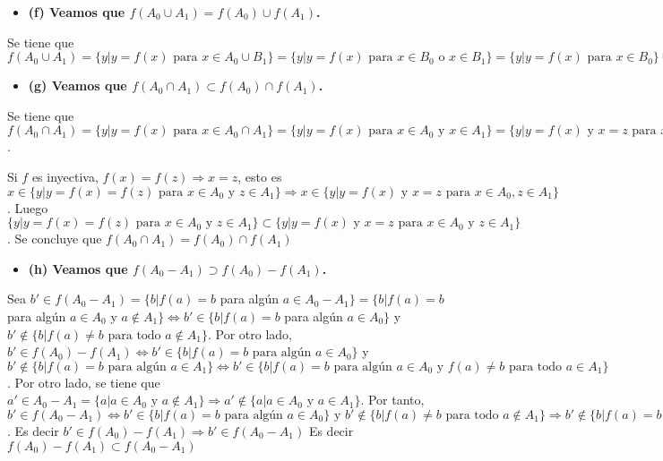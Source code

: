 \documentclass{article}
\begin{document}
\begin{itemize}
\item \bf (f) \rm Veamos que $f(A_0\cup A_1)= f(A_0)\cup f(A_1)$.
\end{itemize}
Se tiene que $f(A_0\cup A_1)=\{y|y=f(x) \text{ para }x\in A_0\cup B_1\}=\{y|y=f(x) \text{ para }x\in B_0\text{ o } x\in B_1\}=\{y|y=f(x) \text{ para }x\in B_0\}\cup \{y|y=f(x) \text{ para }x\in B_1\}=f(B_0)\cup f(B_1)$
\begin{itemize}
\item \bf (g) \rm Veamos que $f(A_0\cap A_1)\subset f(A_0)\cap f(A_1)$.
\end{itemize}
Se tiene que $f(A_0\cap A_1)=\{y|y=f(x) \text{ para }x\in A_0\cap A_1\}=\{y|y=f(x) \text{ para }x\in A_0\text{ y } x\in A_1\}=\{y|y=f(x) \text{ y } x=z \text{ para }x\in A_0,z\in A_1\}\subset\{y|y=f(x)=f(z) \text{ para }x\in A_0\text{ y } z\in A_1\}=\{y|y=f(x) \text{ para }x\in A_0\}\cap \{y|y=f(x) \text{ para }x\in A_1\}=f(A_0)\cap f(A_1)$.

Si $f$ es inyectiva, $f(x)=f(z)\Rightarrow x=z$, esto es $x\in \{y|y=f(x)=f(z) \text{ para }x\in A_0\text{ y } z\in A_1\}\Rightarrow x\in\{y|y=f(x) \text{ y } x=z \text{ para }x\in A_0,z\in A_1\}$. Luego $\{y|y=f(x)=f(z) \text{ para }x\in A_0\text{ y } z\in A_1\}\subset \{y|y=f(x) \text{ y } x=z \text{ para }x\in A_0\text{ y } z\in A_1\}$. Se concluye que $f(A_0\cap A_1)=f(A_0)\cap f(A_1)$
\begin{itemize}
\item \bf (h) \rm Veamos que $f(A_0- A_1)\supset f(A_0)- f(A_1)$.
\end{itemize}
Sea $b'\in f(A_0-A_1)=\{b|f(a)=b $ para algún $a \in A_0-A_1\}=\{b|f(a)=b $ para algún $a \in A_0 $ y $a \notin A_1\} \Leftrightarrow b'\in \{b|f(a)=b $ para algún $a \in A_0\}$ y $b' \notin \{b|f(a)\neq b \text{ para todo }a \notin A_1\}$. Por otro lado, $b'\in f(A_0)-f(A_1) \Leftrightarrow b' \in \{b|f(a)=b \text{ para algún }a \in A_0\}$ y $ b' \notin \{b|f(a)=b \text{ para algún }a \in A_1\} \Leftrightarrow b' \in \{b|f(a)=b \text{ para algún }a \in A_0\text{ y }f(a)\neq b \text{ para todo }a \in A_1\}$. Por otro lado, se tiene que $a' \in A_0 - A_1 = \{a| a \in A_0 \text{ y }a \notin A_1 \} \Rightarrow a' \notin \{a| a \in A_0 \text{ y }a \in A_1\}$. Por tanto, $b' \in f(A_0-A_1)\Leftrightarrow b'\in \{b|f(a)=b \text{ para algún }a \in A_0\}\text{ y }b' \notin \{b|f(a)\neq b \text{ para todo }a \notin A_1\} \Rightarrow b'\notin \{b|f(a)=b \text{ para algún } a \in A_0\text{ y }f(a')\neq b \text{ para todo }a' \in A_1 \}\Leftrightarrow b' \notin \{b|f(a)=b \text{ para algún }a \in A_0\}\text{ o } b' \in \{b|f(a)=b \text{ para algún }a \in A_1\} \Leftrightarrow b' \notin f(A_0)-f(A_1)$. Es decir $b' \in f(A_0)-f(A_1) \Rightarrow b' \in f(A_0 - A_1)$ Es decir $f(A_0)-f(A_1) \subset f(A_0-A_1)$
\end{document}
